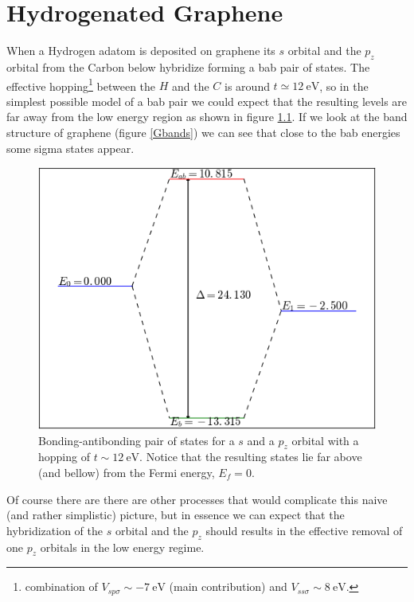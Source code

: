 \chapter{Hydrogenated Graphene}
When a Hydrogen adatom is deposited on graphene its $s$ orbital and the $p_z$ orbital from the Carbon below hybridize forming a \ac{bab} pair of states. The effective hopping\footnote{combination of $V_{sp\sigma}\sim\SI{-7}{\eV}$ (main contribution) and $V_{ss\sigma}\sim\SI{8}{\eV}$.} between the $H$ and the $C$ is around $t\simeq\SI{12}{\eV}$, so in the simplest possible model of a \ac{bab} pair we could expect that the resulting levels are far away from the low energy region as shown in figure \ref{bab}. If we look at the band structure of graphene (figure \ref{Gbands}) we can see that close to the \ac{bab} energies some sigma states appear.
\begin{figure}[h!]
\centering
\includegraphics{chapter05/figures/bonding_antibonding.png}
\caption{Bonding-antibonding pair of states for a $s$ and a $p_z$ orbital with a hopping of $t\sim\SI{12}{\eV}$. Notice that the resulting states lie far above (and bellow) from the Fermi energy, $E_f=0$.}
\label{bab}
\end{figure}
\FloatBarrier
Of course there are there are other processes that would complicate this naive (and rather simplistic) picture, but in essence we can expect that the hybridization of the $s$ orbital and the $p_z$ should results in the effective removal of one $p_z$ orbitals in the low energy regime.\\

